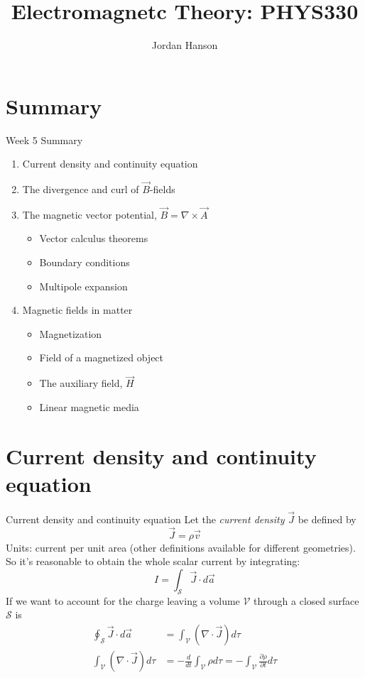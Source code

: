 \documentclass{beamer}
\title{Electromagnetc Theory: PHYS330}
\author{Jordan Hanson}
\institute{Whittier College Department of Physics and Astronomy}
\begin{document}
\maketitle

\section{Summary}

\begin{frame}{Week 5 Summary}
\begin{enumerate}
\item Current density and continuity equation
\item The divergence and curl of $\vec{B}$-fields
\item The magnetic vector potential, $\vec{B} = \nabla \times \vec{A}$
\begin{itemize}
\item Vector calculus theorems
\item Boundary conditions
\item Multipole expansion
\end{itemize}
\item Magnetic fields in matter
\begin{itemize}
\item Magnetization
\item Field of a magnetized object
\item The auxiliary field, $\vec{H}$
\item Linear magnetic media
\end{itemize}
\end{enumerate}
\end{frame}

\section{Current density and continuity equation}

\begin{frame}{Current density and continuity equation}
Let the \textit{current density} $\vec{J}$ be defined by
\begin{equation}
\vec{J} = \rho \vec{v}
\end{equation}
Units: current per unit area (other definitions available for different geometries).  So it's reasonable to obtain the whole scalar current by integrating:
\begin{equation}
I = \int_{\mathcal{S}} \vec{J} \cdot d\vec{a}
\end{equation}
If we want to account for the charge leaving a volume $\mathcal{V}$ through a closed surface $\mathcal{S}$ is
\begin{align}
\oint_{\mathcal{S}} \vec{J} \cdot d\vec{a} &= \int_{\mathcal{V}} (\nabla \cdot \vec{J}) d\tau \\
\int_{\mathcal{V}} (\nabla \cdot \vec{J}) d\tau &= -\frac{d}{dt} \int_{\mathcal{V}} \rho d\tau = -\int_{\mathcal{V}} \frac{\partial \rho}{\partial t} d\tau
\end{align}
\end{frame}
\end{document}
